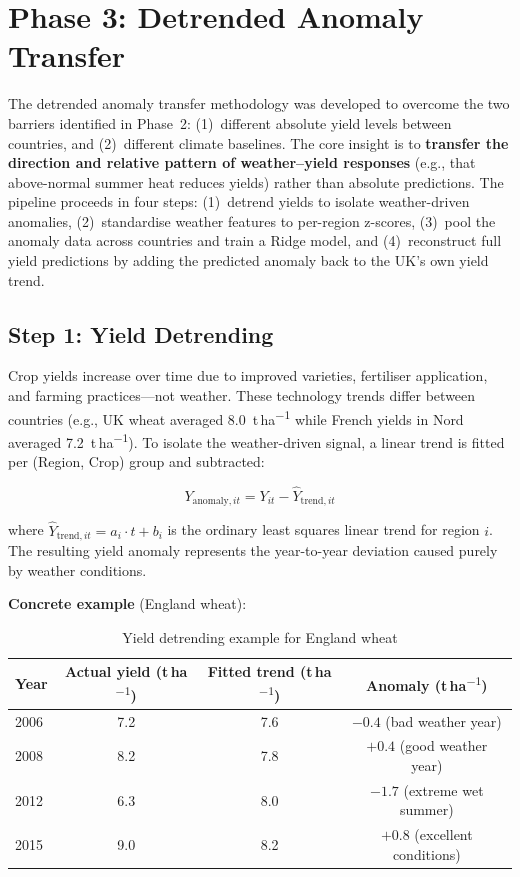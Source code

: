 \documentclass[12pt,a4paper]{report}
\newcommand{\tha}{t\,ha\textsuperscript{$-1$}}
\begin{document}
\section{Phase 3: Detrended Anomaly Transfer}
\label{sec:anomaly_transfer}

The detrended anomaly transfer methodology was developed to overcome the two barriers identified in Phase~2: (1)~different absolute yield levels between countries, and (2)~different climate baselines. The core insight is to \textbf{transfer the direction and relative pattern of weather--yield responses} (e.g., that above-normal summer heat reduces yields) rather than absolute predictions. The pipeline proceeds in four steps: (1)~detrend yields to isolate weather-driven anomalies, (2)~standardise weather features to per-region z-scores, (3)~pool the anomaly data across countries and train a Ridge model, and (4)~reconstruct full yield predictions by adding the predicted anomaly back to the UK's own yield trend.

\subsection{Step 1: Yield Detrending}

Crop yields increase over time due to improved varieties, fertiliser application, and farming practices---not weather. These technology trends differ between countries (e.g., UK wheat averaged 8.0~\tha{} while French yields in Nord averaged 7.2~\tha{}). To isolate the weather-driven signal, a linear trend is fitted per (Region, Crop) group and subtracted:

\begin{equation}
    Y_{\text{anomaly},it} = Y_{it} - \hat{Y}_{\text{trend},it}
\end{equation}

where $\hat{Y}_{\text{trend},it} = a_i \cdot t + b_i$ is the ordinary least squares linear trend for region $i$. The resulting yield anomaly represents the year-to-year deviation caused purely by weather conditions.

\textbf{Concrete example} (England wheat):

\begin{table}[H]
\centering
\caption{Yield detrending example for England wheat}
\label{tab:detrend_example}
\begin{tabular}{lccc}
\toprule
\textbf{Year} & \textbf{Actual yield (\tha{})} & \textbf{Fitted trend (\tha{})} & \textbf{Anomaly (\tha{})} \\
\midrule
2006 & 7.2 & 7.6 & $-0.4$ (bad weather year) \\
2008 & 8.2 & 7.8 & $+0.4$ (good weather year) \\
2012 & 6.3 & 8.0 & $-1.7$ (extreme wet summer) \\
2015 & 9.0 & 8.2 & $+0.8$ (excellent conditions) \\
\bottomrule
\end{tabular}
\end{table}
\end{document}
